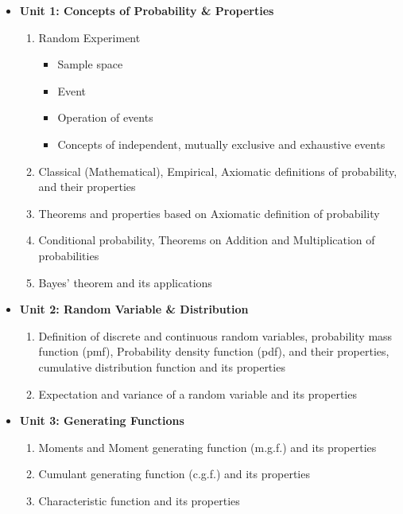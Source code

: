 \documentclass[
10pt, %
a4paper, %
]{report}
\begin{document}
\begin{itemize}
\item[] \textbf{Unit 1: Concepts of Probability \& Properties}
\begin{enumerate}
\item Random Experiment
\begin{itemize}
\item Sample space
\item Event
\item Operation of events
\item Concepts of independent, mutually exclusive and exhaustive events
\end{itemize}
\item Classical (Mathematical), Empirical, Axiomatic definitions of probability, and their properties
\item Theorems and properties based on Axiomatic definition of probability
\item Conditional probability, Theorems on Addition and Multiplication of probabilities
\item Bayes’ theorem and its applications
\end{enumerate}
\item[] \textbf{Unit 2: Random Variable \& Distribution}
\begin{enumerate}
\item Definition of discrete and continuous random variables, probability mass function (pmf), Probability density function (pdf), and their properties, cumulative distribution function and its properties
\item Expectation and variance of a random variable and its properties
\end{enumerate}
\item[] \textbf{Unit 3: Generating Functions}
\begin{enumerate}
\item Moments and Moment generating function (m.g.f.) and its properties
\item Cumulant generating function (c.g.f.) and its properties
\item Characteristic function and its properties
\end{enumerate}
\end{itemize}
\end{document}
